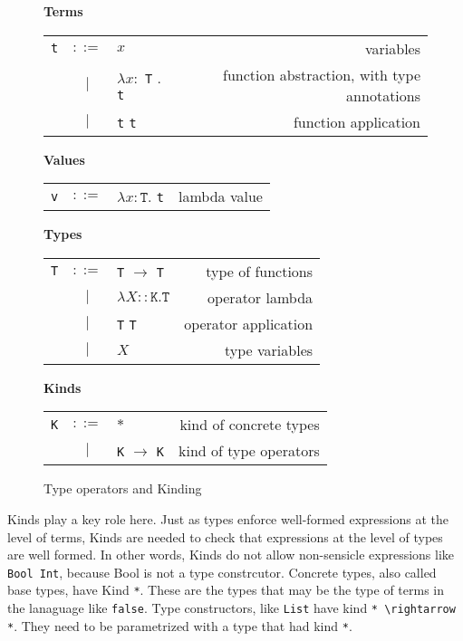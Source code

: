 \begin{figure}[H]\label{fig:tyops}
    \vspace{1cm}
    \textbf{Terms} \\
    \begin{tabular}{l c p{3cm} r}
        \texttt{t} & $ ::= $ & $ x $ &                   variables \\
      & $ | $ & $ \lambda x : $ \texttt{T} . \texttt{t} &          function abstraction, with type annotations \\
      & $ | $ & \texttt{t} \texttt{t} &          function application \\
    \end{tabular}

    \vspace{1cm}
    \textbf{Values} \\
    \begin{tabular}{l c p{3cm} r}
        \texttt{v} & $ ::= $ & $ \lambda x : \texttt{T} . $ \texttt{t} &                   lambda value \\
    \end{tabular}

    \vspace{1cm}
    \textbf{Types} \\
    \begin{tabular}{l c p{3cm} r}
        \texttt{T} & $ ::= $ & \texttt{T} $ \rightarrow $ \texttt{T} &      type of functions \\
        & $ | $ & $ \lambda X :: \texttt{K} . \texttt{T} $ &            operator lambda \\
        & $ | $ & \texttt{T} \texttt{T} &                           operator application \\
        & $ | $ & $ X $ &       type variables \\
    \end{tabular}

    \vspace{1cm}
    \textbf{Kinds} \\
    \begin{tabular}{l c p{3cm} r}
        \texttt{K} & $ ::= $ & $ * $ &      kind of concrete types \\
        & $ | $ & \texttt{K} $ \rightarrow $ \texttt{K} &            kind of type operators
    \end{tabular}

    \caption{Type operators and Kinding}
\end{figure}

Kinds play a key role here. Just as types enforce well-formed expressions at
the level of terms, Kinds are needed to check that expressions at the level of
types are well formed. In other words, Kinds do not allow non-sensicle expressions
like \lstinline{Bool Int}, because Bool is not a type constrcutor. Concrete
types, also called base types, have Kind \lstinline{*}. These are the types
that may be the type of terms in the lanaguage like \lstinline[mathescape]{false}.
Type constructors, like \lstinline{List} have kind \lstinline[mathescape]{* \rightarrow *}.
They need to be parametrized with a type that had kind \lstinline{*}.

